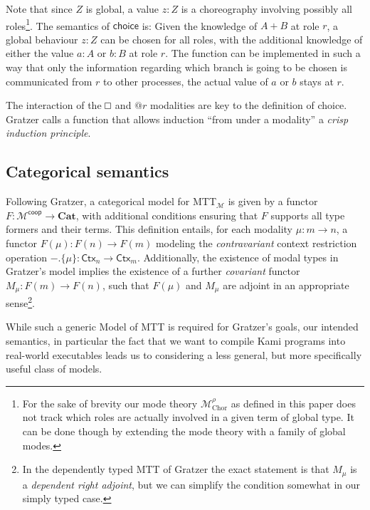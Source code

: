 \documentclass{scrartcl}
\theoremstyle{definition}
\theoremstyle{plain}
\renewcommand{\square}%
  {\tikz{\draw (0,0) rectangle (0.2cm,0.2cm);}}
\begin{document}
Note that since $Z$ is global, a value $z : Z$ is a choreography involving
possibly all roles\footnote{For the sake of brevity our mode theory
$\mathcal{M}^{\rho}_{\textrm{Chor}}$ as defined in this paper does not track
which roles are actually involved in a given term of global type. It can be
done though by extending the mode theory with a family of global modes.}. The
semantics of $\textsf{choice}$ is: Given the knowledge of $A + B$ at role $r$,
a global behaviour $z : Z$ can be chosen for all roles, with the additional
knowledge of either the value $a : A$ or $b : B$ at role $r$. The function can
be implemented in such a way that only the information regarding which branch
is going to be chosen is communicated from $r$ to other processes, the actual
value of $a$ or $b$ stays at $r$.

The interaction of the $\square$ and $@r$ modalities are key to the definition
of choice. Gratzer calls a function that allows induction ``from under a
modality'' a \emph{crisp induction principle}\cite{gratzer2023syntax}.

\subsection{Categorical semantics}
Following Gratzer, a categorical model for MTT$_{\mathcal{M}}$ is given by a
functor $F : \mathcal{M}^{\textsf{coop}} \to \textbf{Cat}$, with additional
conditions ensuring that $F$ supports all type formers and their terms. This
definition entails, for each modality $\mu : m \to n$, a functor $F(\mu) : F(n)
\to F(m)$ modeling the \emph{contravariant} context restriction operation
${-}.\{\mu\} : \textsf{Ctx}_n \to \textsf{Ctx}_m$. Additionally, the existence
of modal types in Gratzer's model implies the existence of a further
\emph{covariant} functor $M_\mu : F(m) \to F(n)$, such that $F(\mu)$ and
$M_\mu$ are adjoint in an appropriate sense\footnote{In the dependently
  typed MTT of Gratzer the exact statement is that $M_\mu$ is a \emph{dependent
  right adjoint}, but we can simplify the condition somewhat in our simply typed
  case.}.

While such a generic Model of MTT is required for Gratzer's goals, our intended
semantics, in particular the fact that we want to compile Kami programs into
real-world executables leads us to considering a less general, but more
specifically useful class of models.
\end{document}
